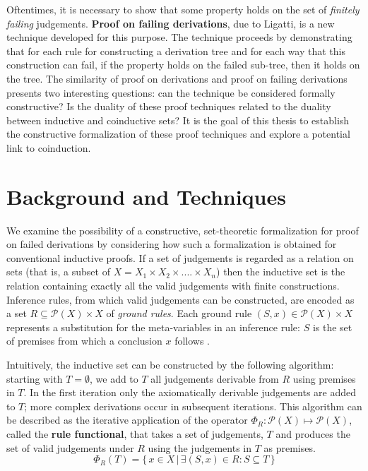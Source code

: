 \documentclass[titlepage]{article}
\begin{document}
Oftentimes, it is necessary to show that some property holds on the set of \textit{finitely failing} judgements. \textbf{Proof on failing derivations}, due to Ligatti, is a new technique developed for this purpose. The technique proceeds by demonstrating that for each rule for constructing a derivation tree and for each way that this construction can fail, if the property holds on the failed sub-tree, then it holds on the tree. The similarity of proof on derivations and proof on failing derivations presents two interesting questions: can the technique be considered formally constructive? Is the duality of these proof techniques related to the duality between inductive and coinductive sets? It is the goal of this thesis to establish the constructive formalization of these proof techniques and explore a potential link to coinduction.

\section{Background and Techniques}
We examine the possibility of a constructive, set-theoretic formalization for proof on failed derivations by considering how such a formalization is obtained for conventional inductive proofs. If a set of judgements is regarded as a relation on sets (that is, a subset of $X = X_1 \times X_2 \times .... \times X_n$) then the inductive set is the relation containing exactly all the valid judgements with finite constructions. Inference rules, from which valid judgements can be constructed, are encoded as a set $R \subseteq \mathcal{P}(X) \times X$ of \textit{ground rules}. Each ground rule $(S,x) \in \mathcal{P}(X) \times X$ represents a substitution for the meta-variables in an inference rule: $S$ is the set of premises from which a conclusion $x$ follows \cite{Sangiorgi2011}. 

Intuitively, the inductive set can be constructed by the following algorithm: starting with $T = \emptyset$, we add to $T$ all judgements derivable from $R$ using premises in $T$. In the first iteration only the axiomatically derivable judgements are added to $T$; more complex derivations occur in subsequent iterations. This algorithm can be described as the iterative application of the operator $\Phi_R:\mathcal{P}(X) \mapsto \mathcal{P}(X)$, called the \textbf{rule functional}, that takes a set of judgements, $T$ and produces the set of valid judgements under $R$ using the judgements in $T$ as premises. $$\Phi_R(T) = \{\,x \in X \,|\,\exists (S,x) \in R : S \subseteq T \,\}$$
\end{document}
